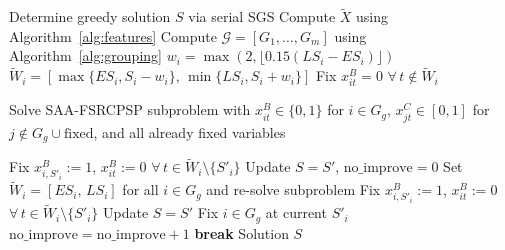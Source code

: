 \begin{algorithm}[ht]
\caption{Procedure of the proposed group-based
         activity-oriented R\&F}
\label{alg:group_rf}
\begin{algorithmic}[1]
\State Determine greedy solution $S$ via serial SGS
\State Compute $\tilde{X}$ using Algorithm~\ref{alg:features}
\State Compute $\mathcal{G}=[G_1,\ldots,G_m]$
       using Algorithm~\ref{alg:grouping}
        \State $w_i=\max(2,\lfloor 0.15(LS_i-ES_i)\rfloor)$
        \State $\widetilde{W}_i=
               [\max\{ES_i,S_i-w_i\},\,
                \min\{LS_i,S_i+w_i\}]$
        \State Fix $x^B_{it}=0$
               $\forall\,t\notin\widetilde{W}_i$
    \EndFor
    \State \parbox[t]{\dimexpr\linewidth-\algorithmicindent\relax}{%
           Solve SAA-FSRCPSP subproblem with
           $x^B_{it}\in\{0,1\}$ for $i\in G_g$,
           $x^C_{jt}\in[0,1]$ for
           $j\notin G_g\cup\mathrm{fixed}$,
           and all already fixed variables}
        \State Fix $x^B_{i,S'_i}:=1$,
               $x^B_{it}:=0$
               $\forall\,t\in\widetilde{W}_i\setminus\{S'_i\}$
        \State Update $S=S'$,\; $\mathrm{no\_improve}=0$
    \Else
        \State Set $\widetilde{W}_i=[ES_i,\,LS_i]$
               for all $i\in G_g$ and re-solve subproblem
            \State Fix $x^B_{i,S'_i}:=1$,
                   $x^B_{it}:=0$
                   $\forall\,t\in\widetilde{W}_i\setminus\{S'_i\}$
            \State Update $S=S'$
        \Else
            \State Fix $i\in G_g$ at current $S'_i$
        \EndIf
        \State $\mathrm{no\_improve}=\mathrm{no\_improve}+1$
    \EndIf
        \State \textbf{break}
    \EndIf
\EndFor
\State \Return Solution $S$
\end{algorithmic}
\end{algorithm}
